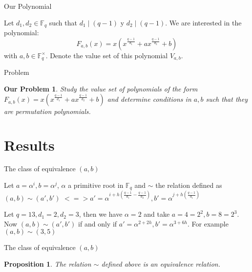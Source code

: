 \documentclass{beamer}
\newtheorem{proposition}{Proposition}
\newtheorem{ourproblem}{Our Problem}
\begin{document}
\begin{frame}{Our Polynomial}
  

  Let $d_1, d_2 \in \mathbb{F}_q$ such that $d_1 \mid (q-1)$ y $d_2 \mid (q-1)$. We are interested in the polynomial:
  {\Large$$F_{a,b}(x) = x(x^{\frac{q-1}{d_1}} + ax^{\frac{q-1}{d_2}} +b)$$ }
  with $a,b \in \mathbb{F}_q^{\times}$. 
  \pause 
  \linebreak
  Denote the value set of this polynomial $V_{a,b}$.

\end{frame}

\begin{frame}{Problem}
  \begin{ourproblem}
    Study the value set of polynomials of the form $F_{a,b}(x) = x(x^{\frac{q-1}{d_1}} + ax^{\frac{q-1}{d_2}} +b)$ and determine conditions in $a,b$ such that they are permutation polynomials.
  \end{ourproblem}
\end{frame}

\section{Results} %
\label{sec:results}

\begin{frame}{The class of equivalence $(a,b)$}
  
  Let $a = \alpha^i, b = \alpha^j$, $\alpha$ a primitive root in $\mathbb{F}_q$ and $\sim$ the relation defined as $(a,b) \sim (a', b')$ 
  $<=> a' = \alpha^{i+h(\frac{q-1}{d_1} - \frac{q-1}{d_2})}, b' = \alpha^{j+h(\frac{q-1}{d_1})}$

  \begin{example}
    Let $q = 13, d_1 = 2, d_2 = 3$, then we have $\alpha = 2$ and take $a = 4 = 2^2, b = 8 = 2^3$. Now $(a,b) \sim (a',b')$ if and only if
    $a' = \alpha^{2+2h}, b' = \alpha^{3+6h}$. For example $(a,b) \sim (3,5)$
  \end{example}

\end{frame}

\begin{frame}{The class of equivalence $(a,b)$}
  
  \begin{proposition}
    The relation $\sim$ defined above is an equivalence relation.
  \end{proposition}

\end{frame}
\end{document}
